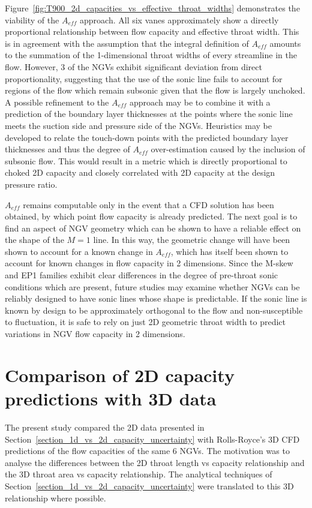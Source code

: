 \documentclass[a4paper, 11pt, oneside]{report}
\begin{document}
Figure~\ref{fig:T900_2d_capacities_vs_effective_throat_widths} demonstrates the viability of the $A_{eff}$ approach. All six vanes approximately show a directly proportional relationship between flow capacity and effective throat width. This is in agreement with the assumption that the integral definition of $A_{eff}$ amounts to the summation of the 1-dimensional throat widths of every streamline in the flow. However, 3 of the NGVs exhibit significant deviation from direct proportionality, suggesting that the use of the sonic line fails to account for regions of the flow which remain subsonic given that the flow is largely unchoked. A possible refinement to the $A_{eff}$ approach may be to combine it with a prediction of the boundary layer thicknesses at the points where the sonic line meets the suction side and pressure side of the NGVs. Heuristics may be developed to relate the touch-down points with the predicted boundary layer thicknesses and thus the degree of $A_{eff}$ over-estimation caused by the inclusion of subsonic flow. This would result in a metric which is directly proportional to choked 2D capacity and closely correlated with 2D capacity at the design pressure ratio.

$A_{eff}$ remains computable only in the event that a CFD solution has been obtained, by which point flow capacity is already predicted. The next goal is to find an aspect of NGV geometry which can be shown to have a reliable effect on the shape of the $M=1$ line. In this way, the geometric change will have been shown to account for a known change in $A_{eff}$, which has itself been shown to account for known changes in flow capacity in 2 dimensions. Since the M-skew and EP1 families exhibit clear differences in the degree of pre-throat sonic conditions which are present, future studies may examine whether NGVs can be reliably designed to have sonic lines whose shape is predictable. If the sonic line is known by design to be approximately orthogonal to the flow and non-susceptible to fluctuation, it is safe to rely on just 2D geometric throat width to predict variations in NGV flow capacity in 2 dimensions.


\section{Comparison of 2D capacity predictions with 3D data}
\label{2d_vs_3d_capacity_uncertainty}

The present study compared the 2D data presented in Section~\ref{section_1d_vs_2d_capacity_uncertainty} with Rolls-Royce's 3D CFD predictions of the flow capacities of the same 6 NGVs. The motivation was to analyse the differences between the 2D throat length vs capacity relationship and the 3D throat area vs capacity relationship. The analytical techniques of Section~\ref{section_1d_vs_2d_capacity_uncertainty} were translated to this 3D relationship where possible.
\end{document}
